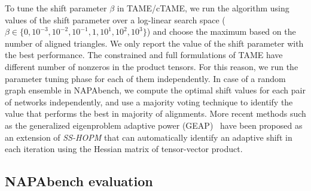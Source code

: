 \documentclass[10pt, journal, compsoc, final]{IEEEtran}
\begin{document}
To tune the shift parameter $\beta$ in TAME/cTAME, we run the algorithm using values of the shift 
parameter over a log-linear search space ($\beta \in \{ 0, 
10^{-3}, 10^{-2}, 10^{-1}, 1, 10^{1}, 10^{2}, 10^{3} \}$) and choose the maximum 
based on the number of aligned triangles. 
We only report the value of the shift parameter with the best performance. 
The constrained and full formulations of TAME have different number of nonzeros in
the product tensors. For this reason, we run the parameter tuning phase 
for each of them independently.
In case of a random graph ensemble in NAPAbench, we compute the optimal shift values for each 
pair of networks independently, and use a majority voting technique to identify the value 
that performs the best in majority of alignments. More recent methods such as the generalized eigenproblem adaptive power (GEAP)~\cite{KoMa14} have been proposed as an extension of \textit{SS-HOPM}
that can automatically identify an adaptive shift in each iteration using the Hessian matrix of tensor-vector product.






\subsection{NAPAbench evaluation}
\end{document}
